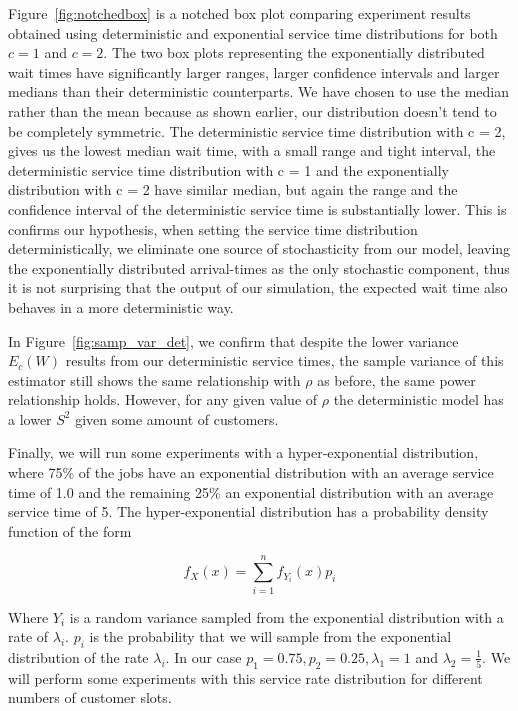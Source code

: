 \documentclass{article}
\begin{document}
    Figure~\ref{fig:notchedbox} is a notched box plot comparing experiment results obtained using deterministic and exponential service time distributions for both $c=1$ and $c=2$. The two box plots representing the exponentially distributed wait times have significantly larger ranges, larger confidence intervals and larger medians than their deterministic counterparts. We have chosen to use the median rather than the mean because as shown earlier, our distribution doesn't tend to be completely symmetric. The deterministic service time distribution with c = 2, gives us the lowest median wait time, with a small range and tight interval, the deterministic service time distribution with c = 1 and the exponentially distribution with c = 2 have similar median, but again the range and the confidence interval of the deterministic service time is substantially lower. This is confirms our hypothesis, when setting the service time distribution deterministically, we eliminate one source of stochasticity from our model, leaving the exponentially distributed arrival-times as the only stochastic component, thus it is not surprising that the output of our simulation, the expected wait time also behaves in a more deterministic way.

    In Figure~\ref{fig:samp_var_det}, we confirm that despite the lower variance $E_c(W)$ results from our deterministic service times, the sample variance of this estimator still shows the same relationship with $\rho$ as before, the same power relationship holds. However, for any given value of $\rho$ the deterministic model has a lower $S^2$ given some amount of customers.

    Finally, we will run some experiments with a hyper-exponential distribution, where 75\% of the jobs have an exponential distribution with an average service time of 1.0 and the remaining 25\% an exponential distribution with an average service time of 5. The hyper-exponential distribution has a probability density function of the form

    \begin{equation}
        f_X(x) = \sum_{i=1}^n f_{Y_i} (x) p_i
    \end{equation}

    Where $Y_i$ is a random variance sampled from the exponential distribution with a rate of $\lambda _ i$. $p_i$ is the probability that we will sample from the exponential distribution of the rate $\lambda _ i$. In our case $p_1 = 0.75, p_2 = 0.25, \lambda_1 = 1$ and $\lambda_2 = \frac{1}{5}$. We will perform some experiments with this service rate distribution for different numbers of customer slots.
\end{document}
